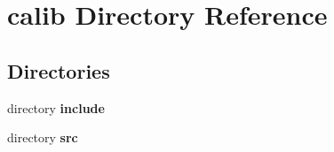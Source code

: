 \section{calib Directory Reference}
\label{dir_7e9d9a29ac97e3b2994b0560dfa06c31}
\subsection*{Directories}
\begin{DoxyCompactItemize}
\item 
directory {\bf include}
\item 
directory {\bf src}
\end{DoxyCompactItemize}
